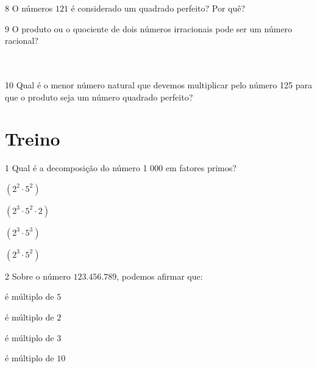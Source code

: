 \num{8} O números $121$ é considerado um quadrado perfeito? Por quê?

\num{9} O produto ou o quociente de dois números irracionais pode ser um
número racional?

\\
\\


\num{10} Qual é o menor número natural que devemos multiplicar pelo número
125 para que o produto seja um número quadrado perfeito?
\\

\section{Treino}

\num{1} Qual é a decomposição do número 1 000 em fatores primos?

\begin{escolha}[itemsep=0pt]
\item $(2^2\cdot 5^2)$
\item $(2^3 \cdot 5^2 \cdot 2)$
\item $(2^3 \cdot 5^3)$
\item $(2^3 \cdot 5^2)$
\end{escolha}









\num{2} Sobre o número $123.456.789$, podemos afirmar que:

\begin{escolha}[itemsep=0pt]
\item é múltiplo de $5$
\item é múltiplo de $2$
\item é múltiplo de $3$
\item é múltiplo de $10$
\end{escolha}


